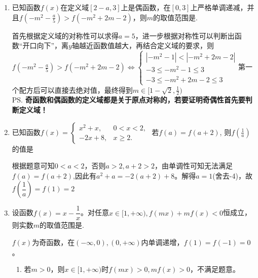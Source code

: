 \begin{enumerate}
    \begin{jieda}
        函数$y = f(3x+1)$为偶函数，且在$[0, +\infty)$上为严格增函数即$f(x)$关于$x = 1$对称，且“开口向上”，因此离对称轴$x = 1$近的变量的函数值小，由此$f(x) < f(2x+1)$可以转化为$|x-1| < |2x|$，两侧平方有$(x-1)^2 < 4x^2$，解得$x \in (-\infty, -1) \cup (\frac{1}{3}, +\infty)$
    \end{jieda}
    \item 已知函数$f(x)$在定义域$[2-a, 3]$上是偶函数，在$[0, 3]$上严格单调递减，并且$f(-m^2-\frac{a}{5}) > f(-m^2+2m-2)$，则$m$的取值范围是\blkda[3]{$[1-\sqrt{2}, \frac{1}{2})$}.
    \begin{jieda}
        首先根据定义域的对称性可以求得$a = 5$，进一步根据对称性可以判断出函数“开口向下”，离$y$轴越近函数值越大，再结合定义域的要求，则$f(-m^2-\frac{a}{5}) > f(-m^2+2m-2) \Leftrightarrow \left \{ \begin{array}{l}
             |-m^2-1| < |-m^2+2m-2|  \\
             -3 \leq -m^2-1 \leq 3  \\
             -3 \leq -m^2+2m-2 \leq 3 
        \end{array}\right.$第一个配方后可以直接去绝对值，最终得到$m \in [1-\sqrt{2}, \frac{1}{2})$ \\
        \ps \textbf{奇函数和偶函数的定义域都是关于原点对称的，若要证明奇偶性首先要判断定义域！}
    \end{jieda}
    \item 已知函数$f(x) = \left\{  
     \begin{array}{ll}  
        x^2+x, & 0 < x < 2, \\  
        -2x+8, & x \geq 2.
     \end{array}
     \right.$ 若$f(a) = f(a+2)$, 则$f(\frac{1}{a})$的值是
     \begin{jieda}
         根据题意可知$0 < a < 2$，否则$a > 2, a+2 > 2$，由单调性可知无法满足$f(a) = f(a+2)$,因此有$a^2 + a = -2(a+2)+8$。解得$a = 1$(舍去-4)，故$f(\dfrac{1}{a}) = f(1) = 2$
     \end{jieda}
    \item 设函数$f(x) = x - \dfrac{1}{x}$。对任意$x \in [1, +\infty), f(mx) + mf(x) < 0$恒成立，则实数$m$的取值范围是.
    \begin{jieda}
        $f(x)$为奇函数，在$(-\infty, 0), (0, +\infty)$内单调递增，$f(1) = f(-1) = 0$。
        \begin{enumerate}
            \item 若$m > 0$，则$x \in [1, +\infty)$时$f(mx) > 0, mf(x) > 0$，不满足题意。

\end{enumerate}
\end{jieda}
\end{enumerate}
